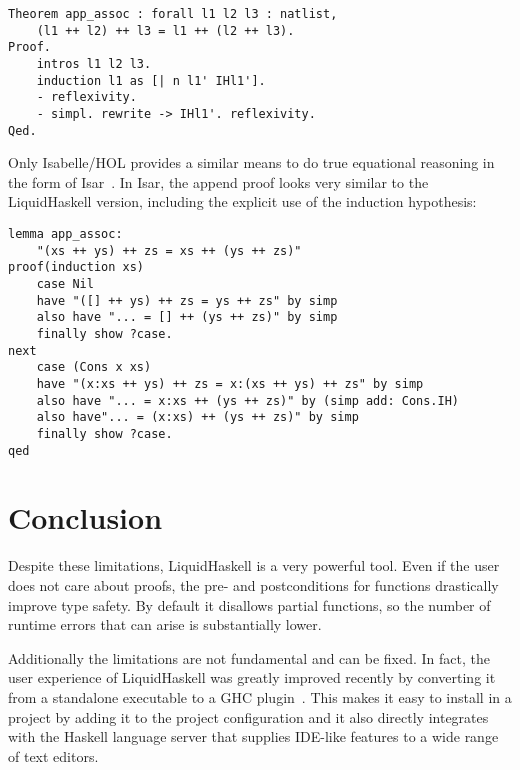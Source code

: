 \documentclass[acmlarge,screen,authorversion=true,nonacm=true]{acmart}
\begin{document}
\begin{lstlisting}
Theorem app_assoc : forall l1 l2 l3 : natlist,
    (l1 ++ l2) ++ l3 = l1 ++ (l2 ++ l3).
Proof.
    intros l1 l2 l3.
    induction l1 as [| n l1' IHl1'].
    - reflexivity.
    - simpl. rewrite -> IHl1'. reflexivity.
Qed.
\end{lstlisting}

Only Isabelle/HOL provides a similar means to do true equational reasoning in the form of Isar~\cite{isar}. In Isar, the append proof looks very similar to the LiquidHaskell version, including the explicit use of the induction hypothesis:

\begin{lstlisting}
lemma app_assoc:
    "(xs ++ ys) ++ zs = xs ++ (ys ++ zs)"
proof(induction xs)
    case Nil
    have "([] ++ ys) ++ zs = ys ++ zs" by simp
    also have "... = [] ++ (ys ++ zs)" by simp
    finally show ?case.
next
    case (Cons x xs)
    have "(x:xs ++ ys) ++ zs = x:(xs ++ ys) ++ zs" by simp
    also have "... = x:xs ++ (ys ++ zs)" by (simp add: Cons.IH)
    also have"... = (x:xs) ++ (ys ++ zs)" by simp
    finally show ?case.
qed
\end{lstlisting}

\section{Conclusion}\label{sec:conclusion}

Despite these limitations, LiquidHaskell is a very powerful tool. Even if the user does not care about proofs, the pre- and postconditions for functions drastically improve type safety. By default it disallows partial functions, so the number of runtime errors that can arise is substantially lower.

Additionally the limitations are not fundamental and can be fixed. In fact, the user experience of LiquidHaskell was greatly improved recently by converting it from a standalone executable to a GHC plugin~\cite{lh_plugin}. This makes it easy to install in a project by adding it to the project configuration and it also directly integrates with the Haskell language server that supplies IDE-like features to a wide range of text editors.





\appendix
\end{document}
